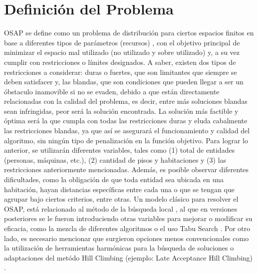 \documentclass[letter, 10pt]{article}
\begin{document}
\section{Definici\'on del Problema}

OSAP se define como un problema de distribuci\'on para ciertos espacios finitos en base a diferentes tipos de par\'ametros (recursos) \cite{awadallah2012office}, con el objetivo principal de minimizar el espacio mal utilizado (no utilizado y sobre utilizado) y, a su vez cumplir con restricciones o l\'imites designados. A saber, existen dos tipos de restricciones a considerar: duras o fuertes, que son limitantes que siempre se deben satisfacer y, las blandas, que son condiciones que pueden llegar a ser un \'obstaculo inamovible si no se evaden, debido a que est\'an directamente relacionadas con la calidad del problema, es decir, entre m\'as soluciones blandas sean infringidas, peor ser\'a la soluci\'on encontrada. La soluci\'on m\'as factible y \'optima ser\'a la que cumpla con todas las restricciones duras y eluda cabalmente las restricciones blandas, ya que as\'i se asegurar\'a el funcionamiento y calidad del algoritmo, sin ning\'un tipo de penalizaci\'on en la funci\'on objetivo.
Para lograr lo anterior, se utilizar\'an diferentes variables, tales como (1) total de entidades (personas, m\'aquinas, etc.), (2) cantidad de pisos y habitaciones y (3) las restricciones anteriormente mencionadas. Adem\'as, es posible observar diferentes dificultades, como la obligaci\'on de que toda entidad sea ubicada en una habitaci\'on, hayan distancias espec\'ificas entre cada una o que se tengan que agrupar bajo ciertos criterios, entre otras.
Un modelo cl\'asico para resolver el OSAP, est\'a relacionado al m\'etodo de la b\'usqueda local \cite{lopes2010office}, al que en versiones posteriores se le fueron introduciendo otras variables para mejorar o modificar su eficacia, como la mezcla de diferentes algoritmos o el uso Tabu Search \cite{USM}. Por otro lado, es necesario mencionar que surgieron opciones menos convencionales como la utilizaci\'on de herramientas harm\'onicas para la b\'usqueda de soluciones \cite{awadallah2012office} o adaptaciones del met\'odo Hill Climbing (ejemplo: Late Acceptance Hill Climbing) \cite{bolaji2019adaptation}.

\end{document}
